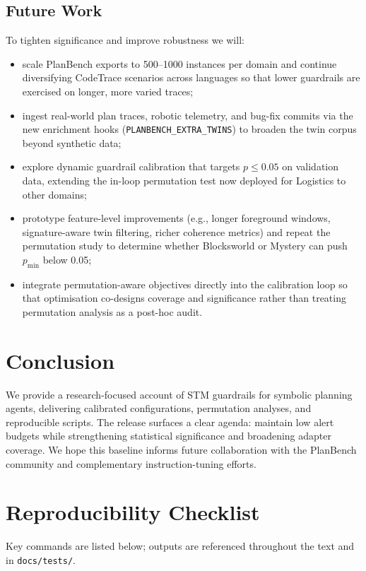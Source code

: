 \documentclass[11pt]{article}
\begin{document}
\subsection{Future Work}
To tighten significance and improve robustness we will:
\begin{itemize}
  \item scale PlanBench exports to 500--1000 instances per domain and continue
        diversifying CodeTrace scenarios across languages so that lower
        guardrails are exercised on longer, more varied traces;
  \item ingest real-world plan traces, robotic telemetry, and bug-fix commits
        via the new enrichment hooks (\texttt{PLANBENCH\_EXTRA\_TWINS}) to broaden the
        twin corpus beyond synthetic data;
  \item explore dynamic guardrail calibration that targets $p \le 0.05$ on
        validation data, extending the in-loop permutation test now deployed for
        Logistics to other domains;
  \item prototype feature-level improvements (e.g., longer foreground windows,
        signature-aware twin filtering, richer coherence metrics) and repeat the
        permutation study to determine whether Blocksworld or Mystery can push
        $p_{\min}$ below 0.05;
  \item integrate permutation-aware objectives directly into the calibration
        loop so that optimisation co-designs coverage and significance rather
        than treating permutation analysis as a post-hoc audit.
\end{itemize}

\section{Conclusion}
We provide a research-focused account of STM guardrails for symbolic planning
agents, delivering calibrated configurations, permutation analyses, and
reproducible scripts. The release surfaces a clear agenda: maintain low alert
budgets while strengthening statistical significance and broadening adapter
coverage. We hope this baseline informs future collaboration with the PlanBench
community and complementary instruction-tuning efforts.

\appendix

\section{Reproducibility Checklist}
Key commands are listed below; outputs are referenced throughout the text and in
\texttt{docs/tests/}.
\end{document}
